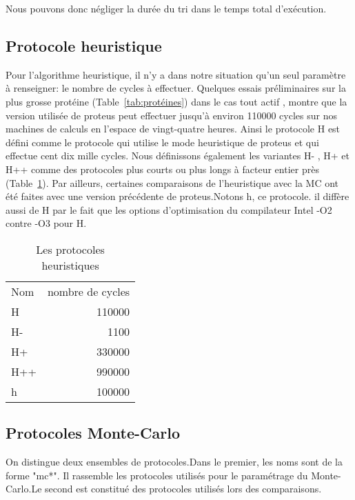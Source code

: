 Nous pouvons donc négliger la durée du tri dans le temps total d'exécution.    


\subsection{Protocole heuristique}

Pour l'algorithme heuristique, il n'y a dans notre situation qu'un seul paramètre à renseigner: le nombre de cycles à effectuer. Quelques essais préliminaires sur la plus grosse protéine (Table~\ref{tab:protéines}) dans le cas tout actif , montre que la version utilisée de proteus peut effectuer jusqu'à environ 110000 cycles sur nos machines de calculs en l'espace de vingt-quatre heures. Ainsi le protocole H est défini comme le protocole qui utilise le mode heuristique de proteus et qui effectue cent dix mille cycles. Nous définissons également les variantes H- , H+ et H++ comme des protocoles plus courts ou plus longs à facteur entier près (Table~\ref{tab:protoH}). Par ailleurs, certaines comparaisons de l'heuristique avec la MC ont été faites avec une version précédente de proteus.Notons h, ce protocole. il diffère  aussi de H par le fait que les options d'optimisation du compilateur Intel -O2 contre -O3 pour H.    


    \begin{table}[!htbp]
      \centering

      \begin{tabular}{lr}

        \toprule
        Nom & nombre de cycles \\
        \cmidrule{1-2}
        H   & 110000 \\  
        H-  & 1100   \\  
        H+  & 330000 \\  
        H++ & 990000 \\  
        h   & 100000 \\  
        \bottomrule

      \end{tabular}      
      \caption{Les protocoles heuristiques}
\label{tab:protoH}      
    \end{table}

   \subsection{Protocoles Monte-Carlo}
\label{sec:MC}
On distingue deux ensembles de protocoles.Dans le premier, les noms  sont de la forme "mc*". Il rassemble les protocoles utilisés pour le paramétrage du Monte-Carlo.Le second est constitué des protocoles utilisés lors des comparaisons.     

